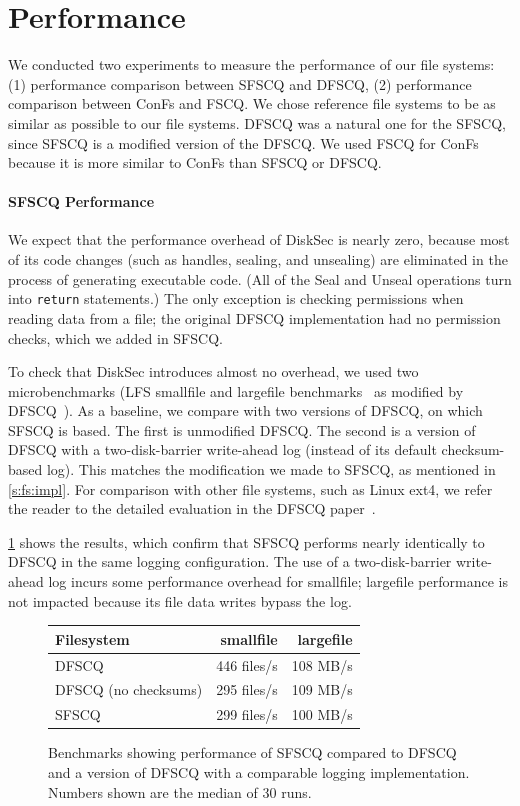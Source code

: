 \section{Performance}
We conducted two experiments to measure the performance of our file systems: (1) performance comparison between SFSCQ and DFSCQ, (2) performance comparison between ConFs and FSCQ. We chose reference file systems to be as similar as possible to our file systems. 
DFSCQ was a natural one for the SFSCQ, since SFSCQ is a modified version of the DFSCQ. We used FSCQ for ConFs because it is more similar to ConFs than SFSCQ or DFSCQ.

\paragraph{SFSCQ Performance}
We expect that the performance overhead of DiskSec is nearly zero, because
most of its code changes (such as handles, sealing, and unsealing) are
eliminated in the process of generating executable code.  (All of the
Seal and Unseal operations turn into \texttt{return} statements.)  The only
exception is checking permissions when reading data from a file; the
original DFSCQ implementation had no permission checks, which we added
in SFSCQ.

To check that DiskSec introduces almost no overhead,
we used two microbenchmarks (LFS smallfile and largefile
benchmarks~\cite{rosenblum:lfs} as modified by DFSCQ~\cite{chen:dfscq}).
As a baseline, we compare with two versions of DFSCQ, on which SFSCQ
is based.  The first is unmodified DFSCQ\@.  The second is a version of
DFSCQ with a two-disk-barrier write-ahead log (instead of its default
checksum-based log).  This matches the modification we made to SFSCQ, as
mentioned in \ref{s:fs:impl}.  For comparison with other file systems,
such as Linux ext4, we refer the reader to the detailed evaluation in
the DFSCQ paper~\cite[\S 7.4]{chen:dfscq}.

\ref{fig:perf} shows the results, which confirm that SFSCQ performs
nearly identically to DFSCQ in the same logging configuration.  The use
of a two-disk-barrier write-ahead log incurs some performance overhead
for smallfile; largefile performance is not impacted because its file
data writes bypass the log.

\begin{figure}[H]
  \centering
  \begin{tabular}{lrr}
    \hline
    \textbf{Filesystem} & \textbf{smallfile} & \textbf{largefile} \\
    \hline
    DFSCQ & 446 files/s & 108 MB/s \\
    DFSCQ (no checksums) & 295 files/s & 109 MB/s \\
    SFSCQ & 299 files/s & 100 MB/s \\
    \hline
  \end{tabular}
  \caption{Benchmarks showing performance of SFSCQ compared to DFSCQ and a
    version of DFSCQ with a comparable logging implementation.  Numbers
    shown are the median of 30 runs.}
  \label{fig:perf}
\end{figure}


